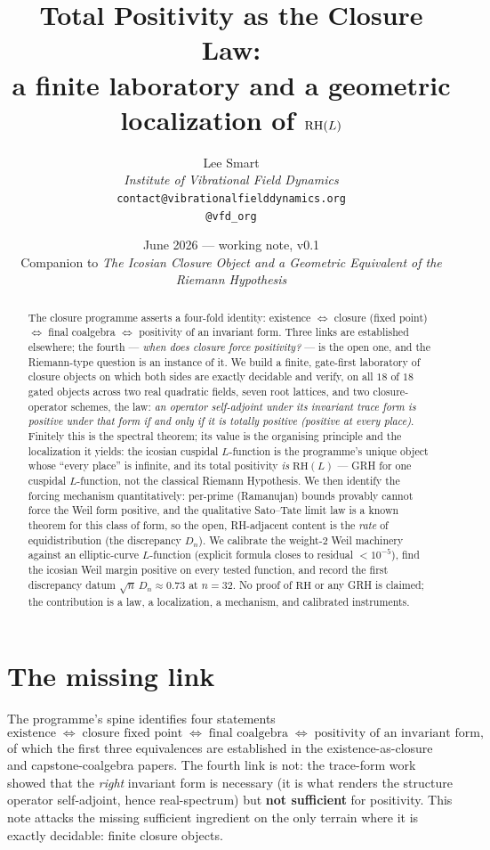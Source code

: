 \documentclass[11pt]{article}
\title{Total Positivity as the Closure Law:\\
a finite laboratory and a geometric localization of $\RH(L)$}
\author{%
  Lee Smart\\[4pt]
  \textit{Institute of Vibrational Field Dynamics}\\[2pt]
  \texttt{contact@vibrationalfielddynamics.org}\\[2pt]
  \texttt{@vfd\_org}%
}
\date{June 2026 --- working note, v0.1\\
\small Companion to \emph{The Icosian Closure Object and a Geometric Equivalent of the
Riemann Hypothesis}}
\theoremstyle{remark}
\newcommand{\RH}{\mathrm{RH}}
\begin{document}
\maketitle

\begin{abstract}
\noindent
The closure programme asserts a four-fold identity: existence $\Leftrightarrow$ closure
(fixed point) $\Leftrightarrow$ final coalgebra $\Leftrightarrow$ positivity of an
invariant form. Three links are established elsewhere; the fourth ---
\emph{when does closure force positivity?} --- is the open one, and the Riemann-type
question is an instance of it. We build a finite, gate-first laboratory of closure
objects on which both sides are exactly decidable and verify, on all $18$ of $18$
gated objects across two real quadratic fields, seven root lattices, and two
closure-operator schemes, the law: \emph{an operator self-adjoint under its invariant
trace form is positive under that form if and only if it is totally positive (positive
at every place)}. Finitely this is the spectral theorem; its value is the organising
principle and the localization it yields: the icosian cuspidal $L$-function is the
programme's unique object whose ``every place'' is infinite, and its total positivity
\emph{is} $\RH(L)$ --- GRH for one cuspidal $L$-function, not the classical Riemann
Hypothesis. We then identify the forcing mechanism quantitatively: per-prime
(Ramanujan) bounds provably cannot force the Weil form positive, and the qualitative
Sato--Tate limit law is a known theorem for this class of form, so the open,
RH-adjacent content is the \emph{rate} of equidistribution (the discrepancy $D_n$).
We calibrate the weight-$2$ Weil machinery against an elliptic-curve $L$-function
(explicit formula closes to residual $<10^{-5}$), find the icosian Weil margin
positive on every tested function, and record the first discrepancy datum
$\sqrt{n}\,D_n \approx 0.73$ at $n=32$. No proof of $\RH$ or any GRH is claimed;
the contribution is a law, a localization, a mechanism, and calibrated instruments.
\end{abstract}

\section{The missing link}\label{sec:link}

The programme's spine identifies four statements
\[
\text{existence} \;\Longleftrightarrow\; \text{closure fixed point}
\;\Longleftrightarrow\; \text{final coalgebra}
\;\Longleftrightarrow\; \text{positivity of an invariant form},
\]
of which the first three equivalences are established in the existence-as-closure and
capstone-coalgebra papers. The fourth link is not: the trace-form work showed that the
\emph{right} invariant form is necessary (it is what renders the structure operator
self-adjoint, hence real-spectrum) but \textbf{not sufficient} for positivity. This
note attacks the missing sufficient ingredient on the only terrain where it is exactly
decidable: finite closure objects.
\end{document}
